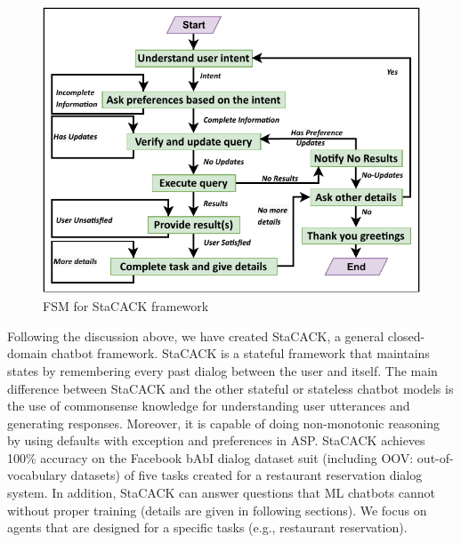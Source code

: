 \documentclass[letterpaper]{article}
\begin{document}
\begin{figure}[h]
    \centering
    \includegraphics[scale = 0.73]{FSM}
    \caption{FSM for StaCACK framework}
    \label{fig:FSM_StaCACK}
\end{figure}

Following the discussion above, we have created StaCACK, a general closed-domain chatbot framework. StaCACK is a stateful framework that maintains states by remembering every past dialog between the user and itself. The main difference between StaCACK and the other stateful or stateless chatbot models is the use of commonsense knowledge for understanding user utterances and generating responses. Moreover, it is capable of doing non-monotonic reasoning by using defaults with exception and preferences in ASP. StaCACK achieves 100\% accuracy on the Facebook bAbI dialog dataset suit \cite{babi_dialog} (including OOV: out-of-vocabulary datasets) of five tasks  created for a restaurant reservation dialog system. In addition, StaCACK can answer questions that ML chatbots cannot without proper training (details are given in following sections). We focus on agents that are designed for a specific tasks (e.g., restaurant reservation).
\end{document}
